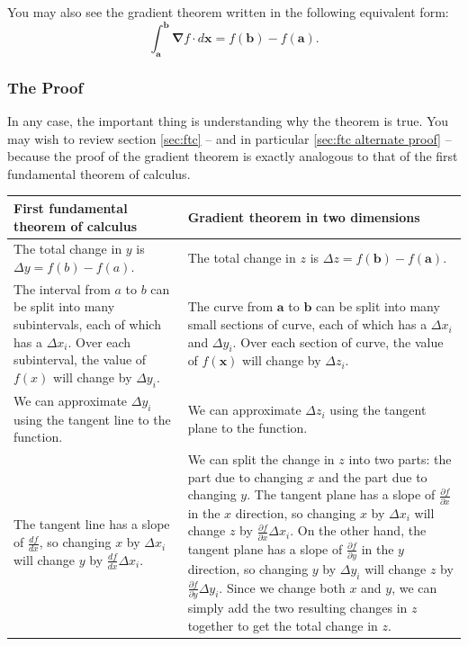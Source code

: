 \documentclass{myarticle}
\renewcommand{\vec}[1]{\mathbf{#1}}
\newcommand{\del}{\boldsymbol{\nabla}}
\theoremstyle{nospace}
\newtheorem{old series theorem}{Theorem}
\newenvironment{series theorem}{\begin{mdframed}\begin{old series theorem}}{\end{old series theorem}\end{mdframed}}
\begin{document}
You may also see the gradient theorem written in the following equivalent form: \[ \int_\vec{a}^\vec{b} \del f \cdot d\vec{x} = f(\vec{b}) - f(\vec{a}). \]

\subsubsection{The Proof} \label{sec:gradient theorem proof}

In any case, the important thing is understanding why the theorem is true. You may wish to review section \ref{sec:ftc} -- and in particular \ref{sec:ftc alternate proof} -- because the proof of the gradient theorem is exactly analogous to that of the first fundamental theorem of calculus.

\renewcommand{\arraystretch}{2}
\begin{longtable}{|p{}|p{}|}
\hline
First fundamental theorem of calculus & Gradient theorem in two dimensions \\
\hline
The total change in $y$ is $\Delta y = f(b) - f(a)$. &
The total change in $z$ is $\Delta z = f(\vec{b}) - f(\vec{a})$. \\

The interval from $a$ to $b$ can be split into many subintervals, each of which has a $\Delta x_i$. Over each subinterval, the value of $f(x)$ will change by $\Delta y_i$. &
The curve from $\vec{a}$ to $\vec{b}$ can be split into many small sections of curve, each of which has a $\Delta x_i$ and $\Delta y_i$. Over each section of curve, the value of $f(\vec{x})$ will change by $\Delta z_i$. \\

We can approximate $\Delta y_i$ using the tangent line to the function. &
We can approximate $\Delta z_i$ using the tangent plane to the function. \\

The tangent line has a slope of $\frac{df}{dx}$, so changing $x$ by $\Delta x_i$ will change $y$ by $\frac{df}{dx} \Delta x_i$. &
We can split the change in $z$ into two parts: the part due to changing $x$ and the part due to changing $y$. The tangent plane has a slope of $\frac{\partial f}{\partial x}$ in the $x$ direction, so changing $x$ by $\Delta x_i$ will change $z$ by $\frac{\partial f}{\partial x} \Delta x_i$. On the other hand, the tangent plane has a slope of $\frac{\partial f}{\partial y}$ in the $y$ direction, so changing $y$ by $\Delta y_i$ will change $z$ by $\frac{\partial f}{\partial y} \Delta y_i$. Since we change both $x$ and $y$, we can simply add the two resulting changes in $z$ together to get the total change in $z$. \\


\end{longtable}
\end{document}
